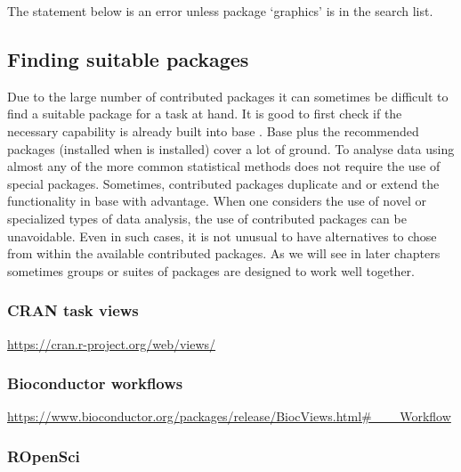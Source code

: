 \documentclass[krantz2]{krantz}\usepackage{knitr}%
\begin{document}
The statement below is an error unless package `graphics' is in the \Rlang search list.
\begin{knitrout}\footnotesize
{}\color{fgcolor}\begin{kframe}
\begin{alltt}
\hlstd{(}\hlstd{)}
\end{alltt}
\end{kframe}
\end{knitrout}

\subsection{Finding suitable packages}

Due to the large number of contributed \Rlang packages it can sometimes be difficult to find a suitable package for a task at hand. It is good to first check if the necessary capability is already built into base \Rlang. Base \Rlang plus the recommended packages (installed when \Rlang is installed) cover a lot of ground. To analyse data using almost any of the more common statistical methods does not require the use of special packages. Sometimes, contributed packages duplicate and or extend the functionality in base \Rlang with advantage. When one considers the use of novel or specialized types of data analysis, the use of contributed packages can be unavoidable. Even in such cases, it is not unusual to have alternatives to chose from within the available contributed packages. As we will see in later chapters sometimes groups or suites of packages are designed to work well together.

\subsubsection{CRAN task views}

\url{https://cran.r-project.org/web/views/}

\subsubsection{Bioconductor workflows}

\url{https://www.bioconductor.org/packages/release/BiocViews.html#___Workflow}

\subsubsection{ROpenSci}
\end{document}
